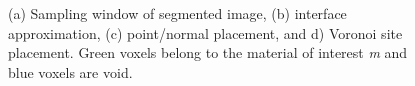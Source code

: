 \begin{figure}[ht]
{\label{fig:vor2}}
%
\caption{(a) Sampling window of segmented image, (b) interface approximation, (c) point/normal placement, and d) Voronoi site placement. Green voxels belong to the material of interest \textit{m} and blue voxels are void.}
\label{fig:vor}
\end{figure}

